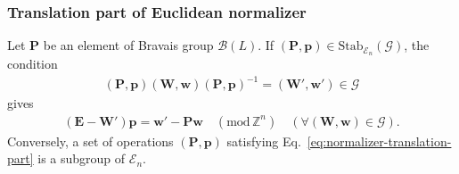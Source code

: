 \subsubsection{Translation part of Euclidean normalizer}
Let $\bm{P}$ be an element of Bravais group $\mathcal{B}(L)$.
If $(\bm{P}, \bm{p} ) \in \mathrm{Stab}_{\mathcal{E}_{n}}(\mathcal{G})$, the condition
\begin{align}
  (\bm{P}, \bm{p}) (\bm{W}, \bm{w}) (\bm{P}, \bm{p})^{-1} = (\bm{W}', \bm{w}') \in \mathcal{G}
\end{align}
gives
\begin{align}
    \label{eq:normalizer-translation-part}
    (\bm{E} - \bm{W}' ) \bm{p} = \bm{w}' - \bm{Pw} \quad (\mathrm{mod}\, \mathbb{Z}^{n})
    \quad (\forall ( \bm{W}, \bm{w} ) \in \mathcal{G} ).
\end{align}
Conversely, a set of operations $(\bm{P}, \bm{p})$ satisfying Eq.~\eqref{eq:normalizer-translation-part} is a subgroup of $\mathcal{E}_{n}$.
